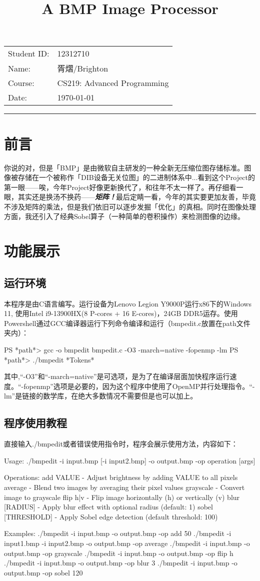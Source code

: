 \documentclass[11pt]{article}
\title{\textbf{A BMP Image Processor}}
\author{} %
\date{}   %
\makeatletter
\renewcommand{\maketitle}{
  \begin{center}
    {\LARGE \@title \par} %
    \vspace{1em}
    \textbf{\@author}     %
    \vspace{1em}
    \begin{tabular}{ll}
      Student ID: & 12312710 \\
      Name:       & 胥熠/Brighton \\
      Course:     & CS219: Advanced Programming \\
      Date:       & \today
    \end{tabular}
    \vspace{0.5em}
    \hrule height 0.8pt %
  \end{center}
}
\makeatother
\begin{document}
\thispagestyle{empty}
\maketitle

{
\tableofcontents
}
\vspace{3em}
\section{前言}
你说的对，但是「BMP」是由微软自主研发的一种全新无压缩位图存储标准。图像被存储在一个被称作「DIB设备无关位图」的二进制体系中...看到这个Project的第一眼——唉，今年Project好像更新换代了，和往年不太一样了。再仔细看一眼，其实还是换汤不换药——\textbf{\textit{矩阵！}}最后定睛一看，今年的其实要更加友善，毕竟不涉及矩阵的乘法，但是我们依旧可以逐步发掘「优化」的真相。同时在图像处理方面，我还引入了经典Sobel算子（一种简单的卷积操作）来检测图像的边缘。


\section{功能展示}
\subsection{运行环境}
本程序是由C语言编写。运行设备为Lenovo Legion Y9000P运行x86下的Windows 11, 使用Intel i9-13900HX(8 P-cores + 16 E-cores)，24GB DDR5运存。使用Powershell通过GCC编译器运行下列命令编译和运行（bmpedit.c放置在path文件夹内）：
\begin{commandline}
PS *path*> gcc -o bmpedit bmpedit.c -O3 -march=native -fopenmp -lm
PS *path*> ./bmpedit *Tokens*
\end{commandline}
其中,“-O3”和“-march=native”是可选项，是为了在编译层面加快程序运行速度。“-fopenmp”选项是必要的，因为这个程序中使用了OpenMP并行处理指令。“-lm”是链接的数学库，在绝大多数情况不需要但是也可以加上。

\subsection{程序使用教程}
直接输入./bmpedit或者错误使用指令时，程序会展示使用方法，内容如下：
\begin{commandline}
Usage: ./bmpedit -i input.bmp [-i input2.bmp] -o output.bmp -op operation [args]

Operations:
  add VALUE        - Adjust brightness by adding VALUE to all pixels
  average          - Blend two images by averaging their pixel values
  grayscale        - Convert image to grayscale
  flip h|v         - Flip image horizontally (h) or vertically (v)
  blur [RADIUS]    - Apply blur effect with optional radius (default: 1)
  sobel [THRESHOLD] - Apply Sobel edge detection (default threshold: 100)
  
Examples:
  ./bmpedit -i input.bmp -o output.bmp -op add 50       
  ./bmpedit -i input1.bmp -i input2.bmp -o output.bmp -op average
  ./bmpedit -i input.bmp -o output.bmp -op grayscale    
  ./bmpedit -i input.bmp -o output.bmp -op flip h       
  ./bmpedit -i input.bmp -o output.bmp -op blur 3 
  ./bmpedit -i input.bmp -o output.bmp -op sobel 120
\end{commandline}
\end{document}
